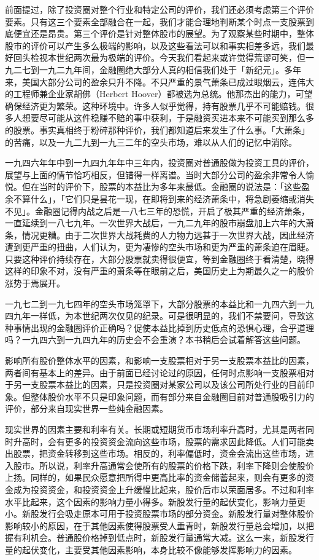 \documentclass[UTF8,a4paper,zihao=-4,fontset = windows]{ctexart} %
\begin{document}
前面提过，除了投资圈对整个行业和特定公司的评价，我们还必须考虑第三个评价要素。只有这三个要素全部融合在一起，我们才能合理地判断某个时点一支股票到底便宜还是昂贵。第三个评价是针对整体股市的展望。为了观察某些时期中，整体股市的评价可以产生多么极端的影响，以及这些看法可以和事实相差多远，我们最好回头检视本世纪两次最为极端的评价。今天我们看起来或许觉得荒谬可笑，但一九二七到一九二九年间，金融圈绝大部分人真的相信我们处于「新纪元」。多年来，美国大部分公司的盈余只升不降。不只严重的景气萧条已成过眼烟云，连伟大的工程师兼企业家胡佛（Herbert Hoover）都被选为总统。他那杰出的能力，可望确保经济更为繁荣。这种环境中。许多人似乎觉得，持有股票几乎不可能赔钱。很多人想要尽可能从这件稳赚不赔的事中获利，于是融资买进本来不可能买到那么多的股票。事实真相终于粉碎那种评价，我们都知道后来发生了什么事。「大萧条」的苦痛，以及一九二九到一九三二年的空头市场，难以从人们的记忆中消除。

一九四六年年中到一九四九年年中三年内，投资圈对普通股做为投资工具的评价，展望与上面的情节恰巧相反，但错得一样离谱。当时大部分公司的盈余非常令人愉悦。但在当时的评价下，股票的本益比为多年来最低。金融圈的说法是：「这些盈余不算什么」，「它们只是昙花一现，在即将到来的经济萧条中，将急剧萎缩或消失不见」。金融圈记得内战之后是一八七三年的恐慌，开启了极其严重的经济萧条，一直延续到一八七九年。一次世界大战后，一九二九年的股市崩盘加上六年的大萧条，情况更糟。由于二次世界大战耗费的人力物力远甚于一次世界大战，因此经济遭到更严重的扭曲，人们认为，更为凄惨的空头市场和更为严重的萧条迫在眉睫。只要这种评价持续存在，大部分股票就卖得很便宜，等到金融圈终于看清楚，晓得这样的印象不对，没有严重的萧条等在眼前之后，美国历史上为期最久之一的股价涨势于焉展开。

一九七二到一九七四年的空头市场笼罩下，大部分股票的本益比和一九四六到一九四九年一样低，为本世纪两次仅见的纪录。可是很明显的，我们不禁要问，导致这种事情出现的金融圈评价正确吗？促使本益比掉到历史低点的恐惧心理，合乎道理吗？一九四六到一九四九年的历史会不会重演？本书稍后会试着解答这些问题。

影响所有股价整体水平的因素，和影响一支股票相对于另一支股票本益比的因素，两者间有基本上的差异。由于前面已经讨论过的原因，任何时点影响一支股票相对于另一支股票本益比的因素，只是投资圈对某家公司以及该公司所处行业的目前印象。但整体股价水平不只是印象问题，而有部分来自金融圈目前对普通股吸引力的评价，部分来自现实世界一些纯金融因素。

现实世界的因素主要和利率有关。长期或短期货币市场利率升高时，尤其是两者同时升高时，会有更多的投资资金流向这些市场，股票的需求因此降低。人们可能卖出股票，把资金转移到这些市场。相反的，利率偏低时，资金会流出这些市场，进入股市。所以说，利率升高通常会使所有的股票的价格下跌，利率下降则会使股价上扬。同样的，如果民众愿意把所得中更高比率的资金储蓄起来，则会有更多的资金成为投资资金，和投资资金上升缓慢比起来，股价后市以荣面居多。不过和利率水平比起来，这个因素的影响力量小得多。新股发行量的起伏变化，影响力量更小。新股发行会吸走原本可用于投资股票市场的部分资金。新股发行量对整体股价影响较小的原因，在于其他因素使得股票受人垂青时，新股发行量总会增加，以把握有利机会。普通股价格掉到低点时，新股发行量通常大减。这么一来，新股发行量的起伏变化，主要受其他因素影响，本身比较不像能够发挥影响力的因素。
\end{document}
